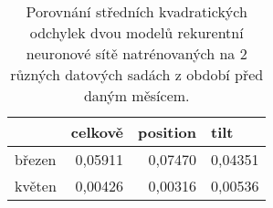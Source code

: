 \begin{table}[htbp]
  \centering
  \begin{tabular}{l|r|r|r}
  \toprule
        & \multicolumn{1}{l|}{celkově} & \multicolumn{1}{l|}{position} & \multicolumn{1}{l}{tilt} \\
  \midrule
  \midrule
  březen & 0,05911 & 0,07470 & 0,04351 \\
  \midrule
  květen & 0,00426 & 0,00316 & 0,00536 \\
  \bottomrule
  \bottomrule
  \end{tabular}%
    \caption[Retraining LSTM]{Porovnání středních kvadratických odchylek dvou modelů rekurentní neuronové sítě natrénovaných na 2 různých datových sadách z období před daným měsícem.}
    \label{tab:retr_lstm}%
\end{table}%
